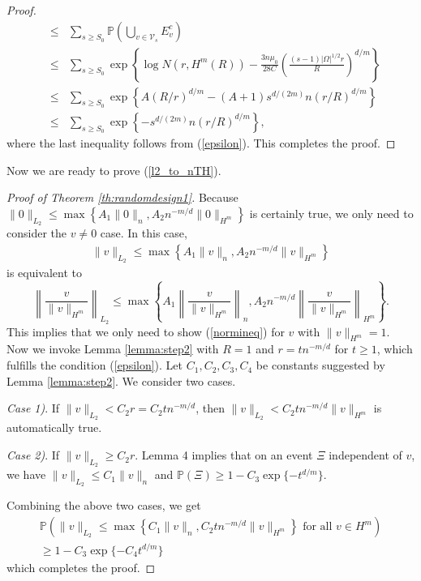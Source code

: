 \documentclass[12pt]{article}
\theoremstyle{plain}
\theoremstyle{remark}
\begin{document}
\begin{proof}
\begin{eqnarray*}
        &\leq&\sum_{s\geq S_0}\mathbb{P}\left(\bigcup_{v\in \mathcal{V}_s}E_v^c\right)\\
        &\leq&\sum_{s\geq S_0}\exp\left\{\log N(r,H^m(R))-\frac{3n\mu_0}{28C}\left(\frac{(s-1)|\Omega|^{1/2}r}{R}\right)^{d/m}\right\}\\
        &\leq&\sum_{s\geq S_0}\exp\left\{A(R/r)^{d/m}-(A+1)s^{d/(2m)}n(r/R)^{d/m}\right\}\\
        &\leq&\sum_{s\geq S_0}\exp\left\{-s^{d/(2m)}n(r/R)^{d/m}\right\},
    \end{eqnarray*}
    where the last inequality follows from (\ref{epsilon}). This completes the proof.
\end{proof}

Now we are ready to prove (\ref{l2_to_nTH}).

\begin{proof}[Proof of Theorem \ref{th:randomdesign1}]
Because $\|0\|_{L_2}\leq \max\left\{A_1 \|0\|_n, A_2 n^{-m/d}\|0\|_{H^m}\right\}$ is certainly true, we only need to consider the $v\neq 0$ case.
In this case,
\begin{eqnarray}\label{normineq}
    \|v\|_{L_2}\leq \max\left\{A_1 \|v\|_{n},A_2n^{-m/d}\|v\|_{H^m}\right\}
\end{eqnarray}
is equivalent to
\[\left\|\frac{v}{\|v\|_{H^m}}\right\|_{L_2}\leq \max\left\{A_1 \left\|\frac{v}{\|v\|_{H^m}}\right\|_{n},A_2n^{-m/d}\left\|\frac{v}{\|v\|_{H^m}}\right\|_{H^m}\right\}.\]
This implies that we only need to show (\ref{normineq}) for $v$ with $\|v\|_{H^m}=1$. Now we invoke Lemma \ref{lemma:step2} with $R=1$ and $r=t n^{-m/d}$ for $t\geq 1$, which fulfills the condition (\ref{epsilon}). Let $C_1,C_2,C_3,C_4$ be constants suggested by Lemma \ref{lemma:step2}. We consider two cases.

\textit{Case 1)}. If $\|v\|_{L_2}<C_2 r=C_2tn^{-m/d}$, then $\|v\|_{L_2}<C_2tn^{-m/d}\|v\|_{H^m}$ is automatically true.

\textit{Case 2)}. If $\|v\|_{L_2}\geq C_2 r$. Lemma 4 implies that on an event $\Xi$ independent of $v$, we have 
    $\|v\|_{L_2}\leq C_1\|v\|_n$
and $\mathbb{P}(\Xi)\geq 1-C_3\exp\{-t^{d/m}\}$.

Combining the above two cases, we get
\begin{eqnarray*}
      \mathbb{P}\left(\|v\|_{L_2}\leq \max\left\{C_1 \|v\|_{n},C_2 t n^{-m/d}\|v\|_{H^m}\right\} \text{ for all } v\in H^m\right)\\ \geq 1-C_3\exp\{-C_4 t^{d/m}\}
\end{eqnarray*}
which completes the proof.
\end{proof}
\end{document}
